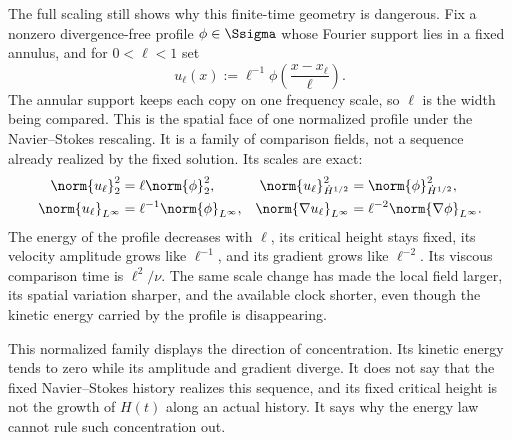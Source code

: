 The full scaling still shows why this finite-time geometry is dangerous.
Fix a nonzero divergence-free profile \(\phi\in\Ssigma\) whose Fourier support lies in a fixed annulus, and for \(0<\ell<1\) set
\[
  u_\ell(x)
  :=\ell^{-1}\phi\!\left(\frac{x-x_\ell}{\ell}\right).
\]
The annular support keeps each copy on one frequency scale, so \(\ell\) is the width being compared.
This is the spatial face of one normalized profile under the Navier--Stokes rescaling.
It is a family of comparison fields, not a sequence already realized by the fixed solution.
Its scales are exact:
\[
\begin{aligned}
  \norm{u_\ell}_2^2
  &=\ell\norm{\phi}_2^2,
  &
  \norm{u_\ell}_{\dot H^{1/2}}^2
  &=\norm{\phi}_{\dot H^{1/2}}^2,
  \\
  \norm{u_\ell}_{L^\infty}
  &=\ell^{-1}\norm{\phi}_{L^\infty},
  &
  \norm{\nabla u_\ell}_{L^\infty}
  &=\ell^{-2}\norm{\nabla\phi}_{L^\infty}.
\end{aligned}
\]
The energy of the profile decreases with \(\ell\), its critical height stays fixed, its velocity amplitude grows like \(\ell^{-1}\), and its gradient grows like \(\ell^{-2}\).
Its viscous comparison time is \(\ell^2/\nu\).
The same scale change has made the local field larger, its spatial variation sharper, and the available clock shorter, even though the kinetic energy carried by the profile is disappearing.

This normalized family displays the direction of concentration.
Its kinetic energy tends to zero while its amplitude and gradient diverge.
It does not say that the fixed Navier--Stokes history realizes this sequence, and its fixed critical height is not the growth of \(H(t)\) along an actual history.
It says why the energy law cannot rule such concentration out.
